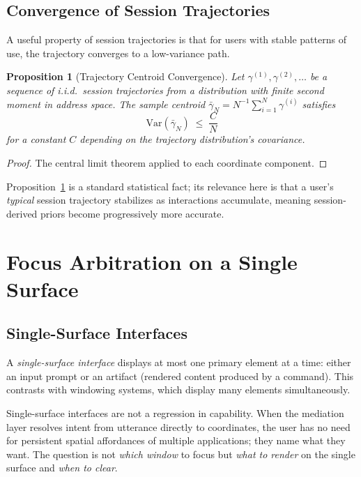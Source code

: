 \documentclass[11pt,twocolumn,a4paper]{article}
\newtheorem{proposition}[theorem]{Proposition}
\theoremstyle{definition}
\theoremstyle{remark}
\begin{document}
\subsection{Convergence of Session Trajectories}

A useful property of session trajectories is that for users with stable patterns of use, the trajectory converges to a low-variance path.

\begin{proposition}[Trajectory Centroid Convergence]
\label{prop:centroid}
Let $\gamma^{(1)}, \gamma^{(2)}, \ldots$ be a sequence of i.i.d.\ session trajectories from a distribution with finite second moment in address space. The sample centroid $\bar\gamma_N = N^{-1} \sum_{i=1}^N \gamma^{(i)}$ satisfies
\[
\mathrm{Var}(\bar\gamma_N) \;\leq\; \frac{C}{N}
\]
for a constant $C$ depending on the trajectory distribution's covariance.
\end{proposition}

\begin{proof}
The central limit theorem applied to each coordinate component.
\end{proof}

Proposition~\ref{prop:centroid} is a standard statistical fact; its relevance here is that a user's \emph{typical} session trajectory stabilizes as interactions accumulate, meaning session-derived priors become progressively more accurate.

\section{Focus Arbitration on a Single Surface}
\label{sec:focus}

\subsection{Single-Surface Interfaces}

A \emph{single-surface interface} displays at most one primary element at a time: either an input prompt or an artifact (rendered content produced by a command). This contrasts with windowing systems, which display many elements simultaneously.

Single-surface interfaces are not a regression in capability. When the mediation layer resolves intent from utterance directly to coordinates, the user has no need for persistent spatial affordances of multiple applications; they name what they want. The question is not \emph{which window} to focus but \emph{what to render} on the single surface and \emph{when to clear}.
\end{document}
